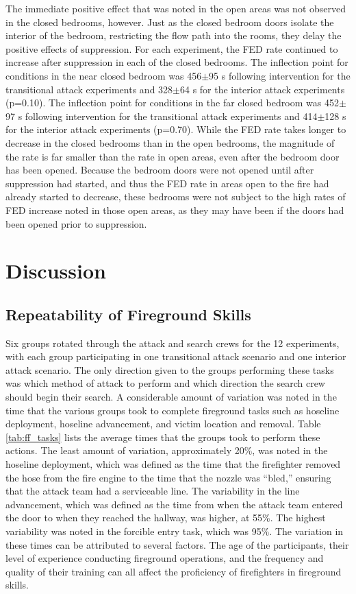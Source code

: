 \documentclass[12pt,oneside]{article}
\begin{document}
The immediate positive effect that was noted in the open areas was not observed in the closed bedrooms, however. Just as the closed bedroom doors isolate the interior of the bedroom, restricting the flow path into the rooms, they delay the positive effects of suppression. For each experiment, the FED rate continued to increase after suppression in each of the closed bedrooms. The inflection point for conditions in the near closed bedroom was 456$\pm$95 s following intervention for the transitional attack experiments and 328$\pm$64 s for the interior attack experiments (p=0.10).  The inflection point for conditions in the far closed bedroom  was 452$\pm$97 s following intervention for the transitional attack experiments and 414$\pm$128 s for the interior attack experiments (p=0.70).  While the FED rate takes longer to decrease in the closed bedrooms than in the open bedrooms, the magnitude of the rate is far smaller than the rate in open areas, even after the bedroom door has been opened. Because the bedroom doors were not opened until after suppression had started, and thus the FED rate in areas open to the fire had already started to decrease, these bedrooms were not subject to the high rates of FED increase noted in those open areas, as they may have been if the doors had been opened prior to suppression. 


\section{Discussion}

\subsection{Repeatability of Fireground Skills}
\label{subsec:ff_repeatability}

 Six groups rotated through the attack and search crews for the 12 experiments, with each group participating in one transitional attack scenario and one interior attack scenario. The only direction given to the groups performing these tasks was which method of attack to perform and which direction the search crew should begin their search. A considerable amount of variation was noted in the time that the various groups took to complete fireground tasks such as hoseline deployment, hoseline advancement, and victim location and removal. Table \ref{tab:ff_tasks} lists the average times that the groups took to perform these actions. The least amount of variation, approximately 20\%, was noted in the hoseline deployment, which was defined as the time that the firefighter removed the hose from the fire engine to the time that the nozzle was ``bled,'' ensuring that the attack team had a serviceable line. The variability in the line advancement, which was defined as the time from when the attack team entered the door to when they reached the hallway, was higher, at 55\%. The highest variability was noted in the forcible entry task, which was  95\%. The variation in these times can be attributed to several factors. The age of the participants, their level of experience conducting fireground operations, and the frequency and quality of their training can all affect the proficiency of firefighters in fireground skills. 
\end{document}
